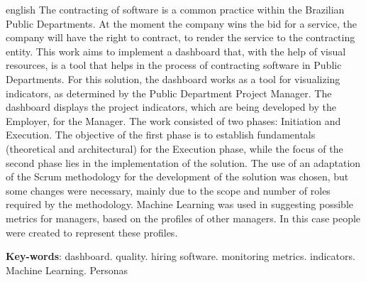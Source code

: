 \begin{resumo}[Abstract]
 \begin{otherlanguage*}{english}
   The contracting of software is a common practice within the Brazilian Public Departments. At the moment the company wins the bid for a service, the company will have the right to contract, to render the service to the contracting entity. This work aims to implement a dashboard that, with the help of visual resources, is a tool that helps in the process of contracting software in Public Departments. For this solution, the dashboard works as a tool for visualizing indicators, as determined by the Public Department Project Manager. The dashboard displays the project indicators, which are being developed by the Employer, for the Manager. The work consisted of two phases: Initiation and Execution. The objective of the first phase is to establish fundamentals (theoretical and architectural) for the Execution phase, while the focus of the second phase lies in the implementation of the solution. The use of an adaptation of the Scrum methodology for the development of the solution was chosen, but some changes were necessary, mainly due to the scope and number of roles required by the methodology. Machine Learning was used in suggesting possible metrics for managers, based on the profiles of other managers. In this case people were created to represent these profiles.

   \vspace{\onelineskip}
 
   \noindent 
   \textbf{Key-words}: dashboard. quality. hiring software. monitoring metrics. indicators. Machine Learning. Personas
 \end{otherlanguage*}
\end{resumo}
